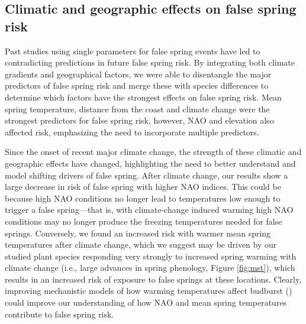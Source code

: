 \documentclass{article}\usepackage[]{graphicx}\usepackage[]{color}
\begin{document}
\subsection*{Climatic and geographic effects on false spring risk}
Past studies using single parameters for false spring events \citep{Liu2018, Ma2018, Vitasse2018, Vitra2017, Wypych2016a} have led to contradicting predictions in future false spring risk. By integrating both climate gradients and geographical factors, we were able to disentangle the major predictors of false spring risk and merge these with species differences to determine which factors have the strongest effects on false spring risk. Mean spring temperature, distance from the coast and climate change were the strongest predictors for false spring risk, however, NAO and elevation also affected risk, emphasizing the need to incorporate multiple predictors. 

Since the onset of recent major climate change, the strength of these climatic and geographic effects have changed, highlighting the need to better understand and model shifting drivers of false spring. After climate change, our results show a large decrease in risk of false spring with higher NAO indices. This could be because high NAO conditions no longer lead to temperatures low enough to trigger a false spring---that is, with climate-change induced warming high NAO conditions may no longer produce the freezing temperatures needed for false springs. Conversely, we found an increased risk with warmer mean spring temperatures after climate change, which we suggest may be driven by our studied plant species responding very strongly to increased spring warming with climate change (i.e., large advances in spring phenology, Figure \ref{fig:mst}), which results in an increased risk of exposure to false springs at these locations. Clearly, improving mechanistic models of how warming temperatures affect budburst (\cite{Gauzere2017,Chuine2016}) could improve our understanding of how NAO and mean spring temperatures contribute to false spring risk.  
\end{document}
